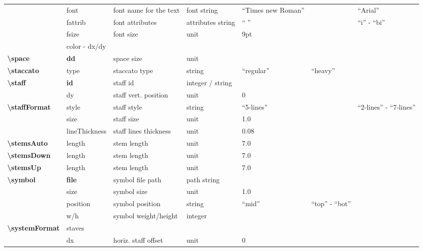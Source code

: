 \documentclass[a4paper, landscape, 10pt]{article}
\begin{document}
\begin{tabularx}{\linewidth}{p{3cm}p{2cm}p{5cm}p{3cm}p{3.5cm}p{3.5cm}p{4cm}}
    &font&font name for the text&font string&``Times new Roman''&&``Arial''\\
    &fattrib&font attributes&attributes string&`` ''&&``i'' - ``bi''\\
    &fsize&font size&unit&9pt&&\\
    &color - dx/dy&&&&&\\
    \hline
    \textbf{\textbackslash{}space}&\textbf{dd}&space size&unit&&&\\
    \hline
    \textbf{\textbackslash{}staccato}&type&staccato type&string&``regular''&``heavy''&\\
    \hline
    \textbf{\textbackslash{}staff}&\textbf{id}&staff id&integer / string&&&\\
    &dy&staff vert. position&unit&0&&\\
    \hline
    \textbf{\textbackslash{}staffFormat}&style&staff style&string&``5-lines''&&``2-lines'' - ``7-lines''\\
    &size&staff size&unit&1.0&&\\
    &lineThickness&staff lines thickness&unit&0.08&&\\
    \hline
    \textbf{\textbackslash{}stemsAuto}&length&stem length&unit&7.0&&\\
    \hline
    \textbf{\textbackslash{}stemsDown}&length&stem length&unit&7.0&&\\
    \hline
    \textbf{\textbackslash{}stemsUp}&length&stem length&unit&7.0&&\\
    \hline
    \textbf{\textbackslash{}symbol}&\textbf{file}&symbol file path&path string&&&\\
    &size&symbol size&unit&1.0&&\\
    &position&symbol position&string&``mid''&``top'' - ``bot''&\\
    &w/h&symbol weight/height&integer&&&\\
    \hline
    \textbf{\textbackslash{}systemFormat}&staves&&&&&\\ %
    &dx&horiz. staff offset&unit&0&&\\
    \hline
\end{tabularx}
\end{document}
